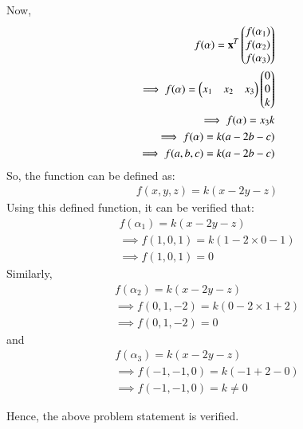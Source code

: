 \documentclass[journal,12pt,twocolumn]{IEEEtran}
\renewcommand\thesection{\arabic{section}}
\begin{document}
Now,
\begin{align}
f(\alpha) = \mathbf{x}^T \begin{pmatrix}f(\alpha_1)\\f(\alpha_2)\\f(\alpha_3)\end{pmatrix}\\
\implies f(\alpha) = \begin{pmatrix}x_1 & x_2 & x_3\end{pmatrix} \begin{pmatrix}0\\0\\k\end{pmatrix}\\
\implies f(\alpha) = x_3 k\\
\implies f(\alpha) = k (a-2b-c)\\
\implies f(a,b,c) = k (a-2b-c)
\end{align}
So, the function can be defined as:
\begin{align}
f(x,y,z) = k (x-2y-z)
\end{align}
Using this defined function, it can be verified that:
\begin{align}
f(\alpha_1) = k (x-2y-z)\\
\implies f(1,0,1)= k(1 - 2\times0 - 1)\\
\implies f(1,0,1)= 0
\end{align}
Similarly,
\begin{align}
f(\alpha_2) = k (x-2y-z)\\
\implies f(0,1,-2)= k(0 - 2\times1 + 2)\\
\implies f(0,1,-2)= 0
\end{align}
and 
\begin{align}
f(\alpha_3) = k (x-2y-z)\\
\implies f(-1,-1,0)= k(-1 + 2 - 0)\\
\implies f(-1,-1,0)= k \neq 0
\end{align}

Hence, the above problem statement is verified.
\end{document}
